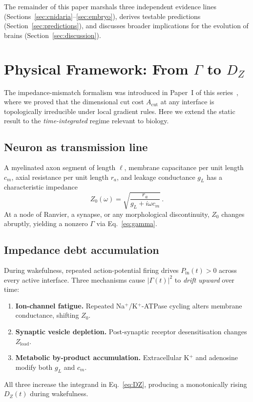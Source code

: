 ﻿\documentclass[aps,pre,twocolumn,superscriptaddress,floatfix]{revtex4-2}
\begin{document}
The remainder of this paper marshals three independent evidence
lines (Sections~\ref{sec:cnidaria}--\ref{sec:embryo}),
derives testable predictions (Section~\ref{sec:predictions}),
and discusses broader implications for the evolution of brains
(Section~\ref{sec:discussion}).


\section{Physical Framework: From $\Gamma$ to $D_Z$}
\label{sec:framework}

The impedance-mismatch formalism was introduced in Paper~I
of this series~\cite{PaperI}, where we proved that the
dimensional cut cost $A_{\mathrm{cut}}$ at any interface
is topologically irreducible under local gradient rules.
Here we extend the static result to the \emph{time-integrated}
regime relevant to biology.

\subsection{Neuron as transmission line}

A myelinated axon segment of length $\ell$, membrane capacitance
per unit length $c_m$, axial resistance per unit length $r_a$,
and leakage conductance $g_L$ has a characteristic impedance
\begin{equation}
  Z_0(\omega) = \sqrt{\frac{r_a}{g_L + i\omega c_m}}\,.
  \label{eq:Z0}
\end{equation}
At a node of Ranvier, a synapse, or any morphological
discontinuity, $Z_0$ changes abruptly, yielding a nonzero
$\Gamma$ via Eq.~\eqref{eq:gamma}.

\subsection{Impedance debt accumulation}

During wakefulness, repeated action-potential firing
drives $P_{\mathrm{in}}(t) > 0$ across every active interface.
Three mechanisms cause $|\Gamma(t)|^2$ to \emph{drift upward}
over time:
\begin{enumerate}
  \item \textbf{Ion-channel fatigue.}
    Repeated Na$^+$/K$^+$-ATPase cycling alters
    membrane conductance, shifting $Z_0$.
  \item \textbf{Synaptic vesicle depletion.}
    Post-synaptic receptor desensitisation changes
    $Z_{\mathrm{load}}$.
  \item \textbf{Metabolic by-product accumulation.}
    Extracellular K$^+$ and adenosine modify both
    $g_L$ and $c_m$.
\end{enumerate}
All three increase the integrand in Eq.~\eqref{eq:DZ},
producing a monotonically rising $D_Z(t)$ during wakefulness.
\end{document}
